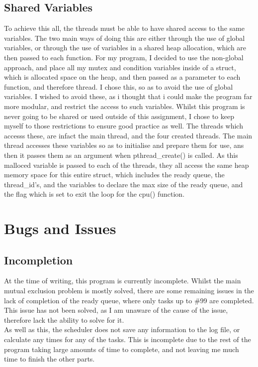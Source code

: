 \documentclass{article}
\begin{document}
    \subsection{Shared Variables}
      To achieve this all, the threads must be able to have shared access to the same variables. The two main ways of doing this are either through the use of global variables, or through the use of variables in a shared heap allocation, which are then passed to each function. For my program, I decided to use the non-global approach, and place all my mutex and condition variables inside of a struct, which is allocated space on the heap, and then passed as a parameter to each function, and therefore thread. I chose this, so as to avoid the use of global variables. I wished to avoid these, as i thought that i could make the program far more modular, and restrict the access to such variables. Whilst this program is never going to be shared or used outside of this assignment, I chose to keep myself to those restrictions to ensure good practice as well. The threads which accesss these, are infact the main thread, and the four created threads. The main thread accesses these variables so as to initialise and prepare them for use, ans then it passes them as an argument when pthread\_create() is called. As this malloced variable is passed to each of the threads, they all access the same heap memory space for this entire struct, which includes the ready queue, the thread\_id's, and the variables to declare the max size of the ready queue, and the flag which is set to exit the loop for the cpu() function.
    \newpage
    \section{Bugs and Issues}
      \subsection{Incompletion}
        At the time of writing, this program is currently incomplete. Whilst the main mutual exclusion problem is mostly solved, there are some remaining issues in the lack of completion of the ready queue, where only tasks up to \#99 are completed. This issue has not been solved, as I am unaware of the cause of the issue, therefore lack the ability to solve for it.\\ As well as this, the scheduler does not save any information to the log file, or calculate any times for any of the tasks. This is incomplete due to the rest of the program taking large amounts of time to complete, and not leaving me much time to finish the other parts.
    \newpage
\end{document}
